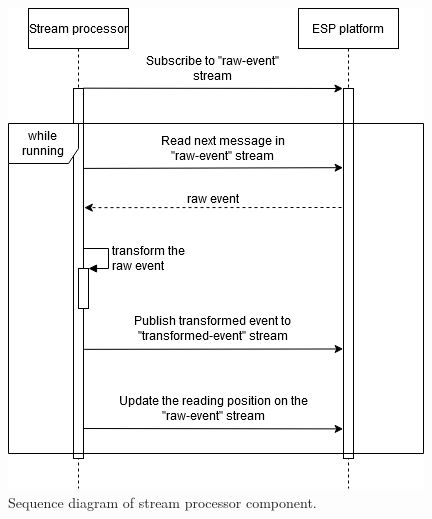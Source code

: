 \begin{figure}[h!]
	\centering
	\includegraphics[width=11cm]{images/implement-stream-processor.png}
	\caption{Sequence diagram of stream processor component.}
	\label{fig:implementstreamprocessor}
\end{figure}
\iffalse
